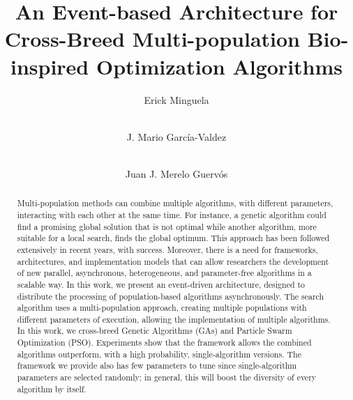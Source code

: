 \documentclass[runningheads]{llncs}
\begin{document}
%
\title{An Event-based Architecture for Cross-Breed Multi-population Bio-inspired Optimization Algorithms}
%
%
\author{Erick Minguela  \and
\\J. Mario Garc\'ia-Valdez  \and
\\Juan J. Merelo Guerv\'os}
%

%
\tocauthor{ }

%
\maketitle              %
%


\begin{abstract}

  Multi-population methods can combine multiple algorithms, with different
  parameters, interacting with each other at the same time. For instance, a
  genetic algorithm could find a promising global solution that is not optimal
  while another algorithm, more suitable for a local search, finds the global
  optimum. This approach has been followed extensively in recent years, with
  success. Moreover, there is a need for frameworks, architectures, and
  implementation models that can allow researchers the development of new
  parallel, asynchronous, heterogeneous, and parameter-free algorithms in a
  scalable way. In this work, we present an event-driven architecture, designed
  to distribute the processing of population-based algorithms asynchronously.
  The search algorithm uses a multi-population approach, creating multiple
  populations with different parameters of execution, allowing the
  implementation of multiple algorithms. In this work, we cross-breed Genetic
  Algorithms (GAs) and Particle Swarm Optimization (PSO). Experiments show that
  the framework allows the combined algorithms outperform, with a high
  probability, single-algorithm versions. The framework we provide also has few
  parameters to tune since single-algorithm parameters are selected randomly; in
  general, this will boost the diversity of every algorithm by itself.


\end{abstract}
%
%
%
\end{document}
